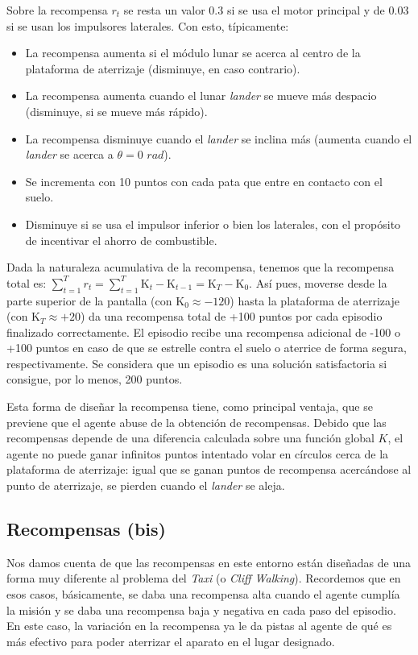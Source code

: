 \documentclass{article}
\begin{document}
Sobre la recompensa $r_t$ se resta un valor $0.3$ si se usa el motor principal y de $0.03$ si se usan los impulsores laterales. Con esto, típicamente:
\begin{itemize}
    \item La recompensa aumenta si el módulo lunar se acerca al centro de la plataforma de aterrizaje (disminuye, en caso contrario).
    \item La recompensa aumenta cuando el lunar \textit{lander} se mueve más despacio (disminuye, si se mueve más rápido).
    \item La recompensa disminuye cuando el \textit{lander} se inclina más (aumenta cuando el \textit{lander} se acerca a $\theta = 0$ $ rad$).
    \item Se incrementa con 10 puntos con cada pata que entre en contacto con el suelo.
    \item Disminuye si se usa el impulsor inferior o bien los laterales, con el propósito de incentivar el ahorro de combustible.
\end{itemize}

Dada la naturaleza acumulativa de la recompensa, tenemos que la recompensa total es: $\sum_{t=1}^Tr_t=\sum_{t=1}^T \text{K}_t - \text{K}_{t-1} = \text{K}_T - \text{K}_0$. Así pues, moverse desde la parte superior de la pantalla (con $\text{K}_0 \approx -120$) hasta la plataforma de aterrizaje (con $\text{K}_T \approx +20$) da una recompensa total de +100 puntos por cada episodio finalizado correctamente. El episodio recibe una recompensa adicional de -100 o +100 puntos en caso de que se estrelle contra el suelo o aterrice de forma segura, respectivamente. Se considera que un episodio es una solución satisfactoria si consigue, por lo menos, 200 puntos.



Esta forma de diseñar la recompensa tiene, como principal ventaja, que se previene que el agente abuse de la obtención de recompensas. Debido que las recompensas depende de una diferencia calculada sobre una función global $K$, el agente no puede ganar infinitos puntos intentado volar en círculos cerca de la plataforma de aterrizaje: igual que se ganan puntos de recompensa acercándose al punto de aterrizaje, se pierden cuando el \textit{lander} se aleja.

\subsection{Recompensas (bis)}
Nos damos cuenta de que las recompensas en este entorno están diseñadas de una forma muy diferente al problema del \textit{Taxi} (o \textit{Cliff Walking}). Recordemos que en esos casos, básicamente, se daba una recompensa alta cuando el agente cumplía la misión y se daba una recompensa baja y negativa en cada paso del episodio. En este caso, la variación en la recompensa ya le da pistas al agente de qué es más efectivo para poder aterrizar el aparato en el lugar designado.
\end{document}
